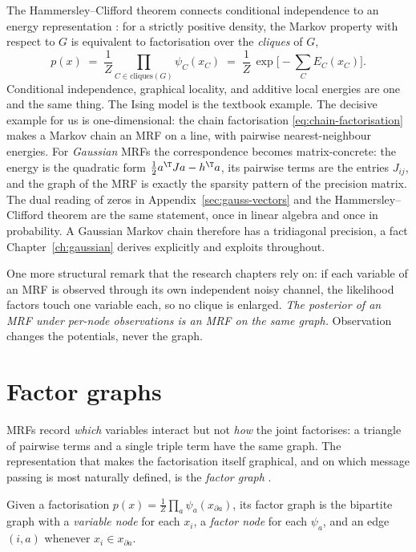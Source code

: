 The Hammersley--Clifford theorem connects conditional independence to an
energy representation \citep[proved in][]{besag1974spatial}: for a strictly
positive density, the Markov property with respect to $G$ is equivalent to
factorisation over the \emph{cliques} of $G$,
\begin{equation}
  p(x) \;=\; \frac{1}{Z} \prod_{C \in \mathrm{cliques}(G)} \psi_C(x_C)
  \;=\; \frac{1}{Z}\, \exp\Big[ -\sum_C E_C(x_C) \Big] .
  \label{eq:hammersley-clifford}
\end{equation}
Conditional independence, graphical locality, and additive local
energies are one and the same thing. The Ising model is the textbook
example. The decisive example for us is one-dimensional:
the chain factorisation \eqref{eq:chain-factorisation} makes a Markov
chain an MRF on a line, with pairwise nearest-neighbour energies. For
\emph{Gaussian} MRFs the correspondence becomes matrix-concrete: the
energy is the quadratic form $\tfrac12 a^\T J a - h^\T a$, its pairwise
terms are the entries $J_{ij}$, and the graph of the MRF is exactly the
sparsity pattern of the precision matrix. The dual reading of zeros in
Appendix~\ref{sec:gauss-vectors} and the Hammersley--Clifford theorem are
the same statement, once in linear algebra and once in probability. A
Gaussian Markov chain therefore has a tridiagonal precision, a fact
Chapter~\ref{ch:gaussian} derives explicitly and exploits throughout.

One more structural remark that the research chapters rely on: if each
variable of an MRF is observed through its own independent noisy channel,
the likelihood factors touch one variable each, so no clique is
enlarged. \emph{The posterior of an MRF under per-node observations is an
MRF on the same graph.} Observation changes the potentials, never the
graph.

\section{Factor graphs}\label{sec:factor-graphs}

MRFs record \emph{which} variables interact but not \emph{how} the joint
factorises: a triangle of pairwise terms and a single triple term have
the same graph. The representation that makes the factorisation itself
graphical, and on which message passing is most naturally defined, is
the \emph{factor graph} \citep{kschischang2001factor,
koller2009probabilistic}.

\begin{definition}
Given a factorisation
$p(x) = \frac{1}{Z}\prod_{a} \psi_a(x_{\partial a})$, its factor graph is
the bipartite graph with a \emph{variable node} for each $x_i$, a
\emph{factor node} for each $\psi_a$, and an edge $(i, a)$ whenever
$x_i \in x_{\partial a}$.
\end{definition}

